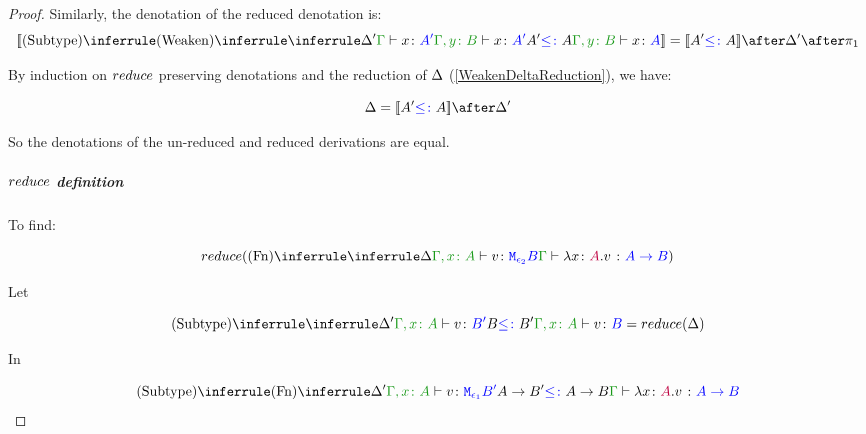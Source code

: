 \documentclass{report}
\begin{document}
\begin{framed}
\begin{proof}
                Similarly, the denotation of the reduced denotation is:
                \begin{equation}
                    \deno{\ntreeruleII{\vsubtype}{
                        \ntreeruleI{\vweaken}{
                            \treeruleI{\D'}{\gtyperelation{x}{A'}}
                        } {
                            \typerelation{\gby}{x}{A'}
                        }
                        }{
                        A' \subtype A
                        }{\typerelation{\gby}{x}{A}}} = \deno{A'\subtype A}\after \D' \after \p
                \end{equation}
        
        
                By induction on $reduce$ preserving denotations and the reduction of $\Delta$ (\ref{WeakenDeltaReduction}), we have:
        
                \begin{equation}
                    \D = \deno{A' \subtype A}\after\D'
                \end{equation}
        
                So the denotations of the un-reduced and reduced derivations are equal.
        
                \case{\vfun}
                \subparagraph{$reduce$ definition}
                    To find:
                
                    \begin{equation}
                        \reduce(\ntreeruleI{\vfun}{
                            \treeruleI{\D}{\typerelation{\gax}{v}{\M{\e_2}{B}}}
                        }{\gtyperelation{\lam{x}{A}{v}}{\ab}})
                    \end{equation}
        
                    Let 
        
                    \begin{equation}
                        \ntreeruleII{\vsubtype}{
                            \treeruleI{\D'}{\typerelation{\gax}{v}{B'}}
                            }{B\subtype B'}{
                            \typerelation{\gax}{v}{B}
                        } = \reduce(\D)
                    \end{equation}
        
                    In
        
                    \begin{equation}
                        \ntreeruleII{\vsubtype}{
                            \ntreeruleI{\vfun}{
                                \D'
                            }{
                                \typerelation{\gax}{v}{\M{\e_1}{B'}}
                            }
                            }{
                            \fntype{A}{B'}\subtype\ab
                        } {
                            \gtyperelation{\lam{x}{A}{v}}{\ab}
                        }
                    \end{equation}
        

\end{proof}
\end{framed}
\end{document}
